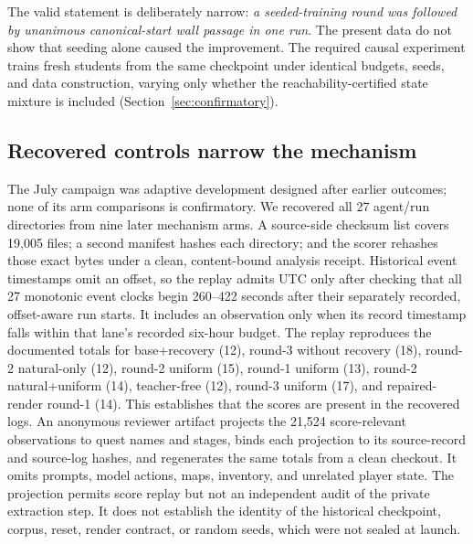 \documentclass[11pt,a4paper]{article}
\begin{document}
The valid statement is deliberately narrow: \emph{a seeded-training round was
followed by unanimous canonical-start wall passage in one run}. The present data do not
show that seeding alone caused the improvement. The required causal experiment
trains fresh students from the same checkpoint under identical budgets, seeds,
and data construction, varying only whether the reachability-certified state mixture is
included (Section~\ref{sec:confirmatory}).

\subsection{Recovered controls narrow the mechanism}

The July campaign was adaptive development designed after earlier outcomes;
none of its arm comparisons is confirmatory. We recovered all 27 agent/run
directories from nine later mechanism arms. A
source-side checksum list covers 19,005 files; a second manifest hashes each
directory; and the scorer rehashes those exact bytes under a clean,
content-bound analysis receipt. Historical event timestamps omit an offset, so
the replay admits UTC only after checking that all 27 monotonic event clocks
begin 260--422 seconds after their separately recorded, offset-aware run starts. It
includes an observation only when its record timestamp falls within that
lane's recorded six-hour budget. The replay
reproduces the documented totals for base+recovery (12), round-3 without
recovery (18), round-2 natural-only (12), round-2 uniform (15), round-1 uniform
(13), round-2 natural+uniform (14), teacher-free (12), round-3 uniform (17),
and repaired-render round-1 (14). This establishes that the scores are present
in the recovered logs. An anonymous reviewer artifact projects the 21,524
score-relevant observations to quest names and stages, binds each projection
to its source-record and source-log hashes, and regenerates the same totals
from a clean checkout. It omits prompts, model actions, maps, inventory, and
unrelated player state. The projection permits score replay but not an
independent audit of the private extraction step. It
does not establish the identity of the historical checkpoint, corpus, reset,
render contract, or random seeds, which were not sealed at launch.
\end{document}
